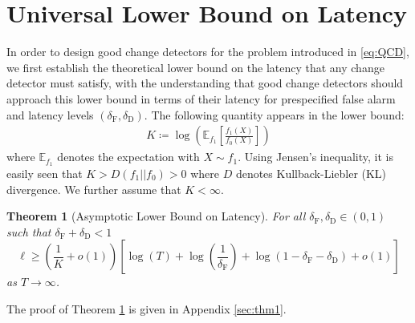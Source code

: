 \documentclass[12pt]{interact}
\newcommand{\lp}{\left(}
\newcommand{\rp}{\right)}
\newcommand{\lb}{\left[}
\newcommand{\rb}{\right]}
\newcommand{\mrm}{\mathrm}
\newcommand{\E}{\mathbb{E}}
\theoremstyle{plain}
\newtheorem{theorem}{Theorem}
\newcommand{\yhh}[1]{{\color{purple}{#1}}}
\begin{document}
\section{Universal Lower Bound on Latency} \label{sec:low_bound}
%
In order to design good change detectors for the problem introduced in \eqref{eq:QCD}, we first establish the theoretical lower bound on the latency that any change detector must satisfy, with the understanding that good change detectors should approach this lower bound in terms of their latency for prespecified false alarm and latency levels $(\delta_{\mrm{F}}, \delta_{\mrm{D}})$. 
%
The following quantity appears in the lower bound:
\begin{align}
K\coloneqq\log\lp\E_{f_{1}}\lb\frac{f_{1}\lp X\rp}{f_{0}\lp X\rp}\rb\rp \label{eq:C_const}   
\end{align}
%
where $\E_{f_{1}}$ denotes the expectation with $X \sim f_{1}$. Using Jensen's inequality, it is easily seen that $K>D(f_{1}||f_{0})>0$ where $D$ denotes Kullback-Liebler (KL) divergence.  We further assume that $K<\infty$.

\begin{theorem}[Asymptotic Lower Bound on Latency] \label{thm:low_bound_latency} For all $\delta_{\mathrm{F}}, \delta_{\mathrm{D}} \in \lp 0, 1 \rp$ such that $\delta_{\mathrm{F}} + \delta_{\mathrm{D}}<1$
%
\begin{equation}
\ell \geq \lp\frac{1}{K} + o\lp 1\rp\rp \lb\log\lp T\rp + \log\lp \frac{1}{\delta_{\mathrm{F}}}\rp + \log\lp1 - \delta_{\mathrm{F}} - \delta_{\mathrm{D}}\rp + o\lp 1\rp\rb\label{eq:d_lower}
\end{equation}
as $T \to \infty$.
%
\end{theorem}
%
The proof of Theorem \ref{thm:low_bound_latency} is given in Appendix \ref{sec:thm1}. 
\end{document}
